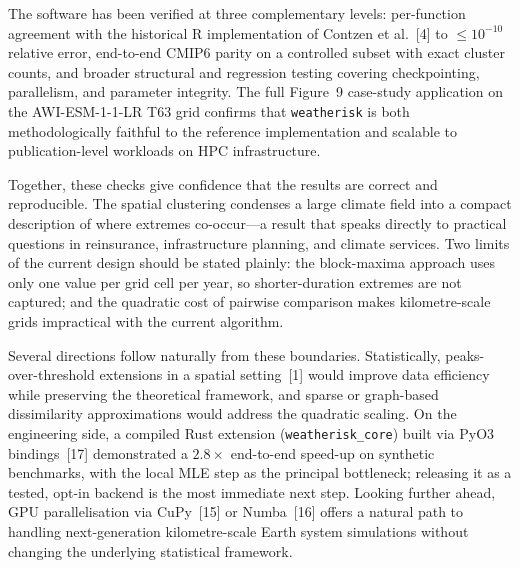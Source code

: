\documentclass[preprint,12pt,a4paper]{elsarticle}
\newcommand{\revb}[1]{{\color{RevisionBlue}#1}}
\newcommand{\revg}[1]{{\color{RevisionGreen}#1}}
\newcommand{\revo}[1]{{\color{RevisionOrange}#1}}
\begin{document}
\revg{The software has been verified at three complementary levels:
per-function agreement with the historical R implementation of
Contzen et al.~[4] to $\leq 10^{-10}$ relative error,
end-to-end CMIP6 parity on a controlled subset \revb{with exact
cluster counts}, and broader structural and regression testing
covering checkpointing, parallelism, and parameter integrity.
The full Figure~9 \revb{case-study application} on the
AWI-ESM-1-1-LR T63 grid confirms that \texttt{weatherisk} is both
methodologically faithful to the reference implementation and
scalable to publication-level workloads on HPC infrastructure.}

\revg{Together, these checks give confidence that the results are correct and reproducible. The spatial clustering condenses a large
climate field into a compact description of where extremes co-occur---a
result that speaks directly to practical questions in reinsurance,
infrastructure planning, and climate services. Two limits of the current
design should be stated plainly: the block-maxima approach uses only
one value per grid cell per year, so shorter-duration extremes are
not captured; and the quadratic cost of pairwise comparison makes
kilometre-scale grids impractical with the current algorithm.}

\revo{Several directions follow naturally from these boundaries.
Statistically, peaks-over-threshold extensions in a spatial
setting~[1] would improve data efficiency while preserving the
theoretical framework, and sparse or graph-based dissimilarity
approximations would address the quadratic scaling. On the
engineering side, a compiled Rust extension
(\texttt{weatherisk\_core}) built via PyO3 bindings~[17] demonstrated
a $2.8\times$ end-to-end speed-up on synthetic benchmarks, with the
local MLE step as the principal bottleneck; releasing it as a tested,
opt-in backend is the most immediate next step. Looking further
ahead, GPU parallelisation via CuPy~[15] or Numba~[16] offers a
natural path to handling next-generation kilometre-scale Earth system
simulations without changing the underlying statistical framework.}
\end{document}

